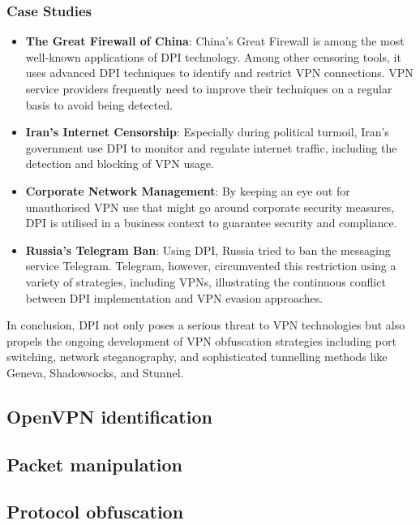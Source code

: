 \documentclass[12pt, fleqn, a4paper]{article}
\begin{document}
\subsubsection{Case Studies}
\begin{itemize}
  \item \textbf{The Great Firewall of China}: China's Great Firewall is among the most well-known applications of DPI technology. Among other censoring tools, it uses advanced DPI techniques to identify and restrict VPN connections. VPN service providers frequently need to improve their techniques on a regular basis to avoid being detected.
  \item \textbf{Iran's Internet Censorship}: Especially during political turmoil, Iran's government use DPI to monitor and regulate internet traffic, including the detection and blocking of VPN usage.
  \item \textbf{Corporate Network Management}: By keeping an eye out for unauthorised VPN use that might go around corporate security measures, DPI is utilised in a business context to guarantee security and compliance.
  \item \textbf{Russia's Telegram Ban}: Using DPI, Russia tried to ban the messaging service Telegram. Telegram, however, circumvented this restriction using a variety of strategies, including VPNs, illustrating the continuous conflict between DPI implementation and VPN evasion approaches.
\end{itemize}

In conclusion, DPI not only poses a serious threat to VPN technologies but also propels the ongoing development of VPN obfuscation strategies including port switching, network steganography, and sophisticated tunnelling methods like Geneva, Shadowsocks, and Stunnel.


\subsection{OpenVPN identification}
\subsection{Packet manipulation}
\subsection{Protocol obfuscation}
\end{document}
